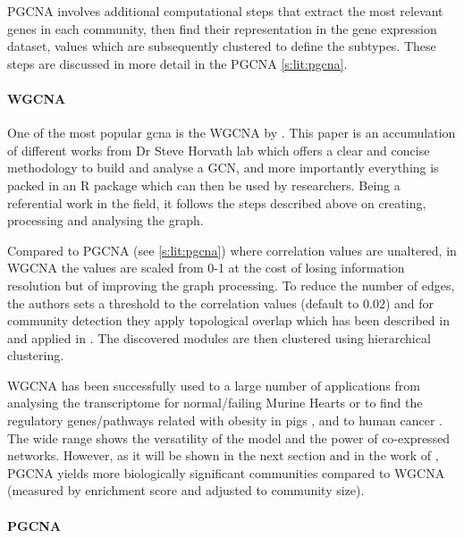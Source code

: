 PGCNA involves additional computational steps that extract the most relevant genes in each community, then find their representation in the gene expression dataset, values which are subsequently clustered to define the subtypes. These steps are discussed in more detail in the PGCNA \cref{s:lit:pgcna}.


\paragraph*{WGCNA} \label{s:lit:WGCNA}

One of the most popular \acrfull{gcna} is the WGCNA by \citet{Langfelder2008-sn}. This paper is an accumulation of different works from Dr Steve Horvath lab which offers a clear and concise methodology to build and analyse a GCN, and more importantly everything is packed in an R package which can then be used by researchers. Being a referential work in the field, it follows the steps described above on creating, processing and analysing the graph.

Compared to PGCNA (see \cref{s:lit:pgcna}) where correlation values are unaltered, in WGCNA the values are scaled from 0-1 at the cost of losing information resolution but of improving the graph processing. To reduce the number of edges, the authors sets a threshold to the correlation values (default to $0.02$) and for community detection they apply topological overlap which has been described in \cite{Zhang2005-xq} and applied in \citep{Yip2007-mr, Li2007-vz, Ravasz2002-au}. The discovered modules are then clustered using hierarchical clustering.

WGCNA has been successfully used to a large number of applications from analysing the transcriptome for normal/failing Murine Hearts \citep{Lee2011-wm} or to find the regulatory genes/pathways related with obesity in pigs \citep{Kogelman2014-ea}, and to human cancer \citep{Yang2014-wv, Clarke2013-wd, Care2019-ij}. The wide range shows the versatility of the model and the power of co-expressed networks. However, as it will be shown in the next section and in the work of \citet{Care2019-ij}, PGCNA yields more biologically significant communities compared to WGCNA (measured by enrichment score and adjusted to community size).

\paragraph*{PGCNA} \label{s:lit:pgcna}

